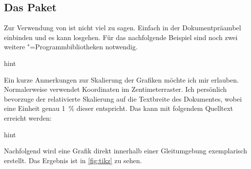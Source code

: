 \documentclass[%
  english,ngerman,%
  cdgeometry=no,DIV=12,%
  cd=false,cdfont=false,cdtitle=true,%
  headings=normal,%
  automark,%
  listof=toc,%
]{tudscrartcl}
\begin{document}
\subsection{Das Paket }

Zur Verwendung von  ist nicht viel zu sagen. Einfach in der 
Dokumentpräambel einbinden und es kann losgehen. Für das nachfolgende Beispiel 
sind noch zwei weitere "=Programmbibliotheken notwendig.
%
\begin{Code}{hint}
\usepackage{tikz}
\usetikzlibrary{chains}
\usetikzlibrary{decorations.markings}
\tikzset{on grid}
\end{Code}

Ein kurze Anmerkungen zur Skalierung der Grafiken möchte ich mir erlauben. 
Normalerweise verwendet  Koordinaten im Zentimeterraster. Ich 
persönlich bevorzuge der relativierte Skalierung auf die Textbreite des 
Dokumentes, wobei eine Einheit genau \SI{1}{\percent} dieser entspricht. Das 
kann mit folgendem Quelltext erreicht werden:
%
\CodeHook{\renewcommand\newlength[1]{}}
\begin{Code}[input]{hint}
\newlength{\tikzunit}
\setlength{\tikzunit}{.01\textwidth}
\tikzset{x=\tikzunit,y=\tikzunit}
\end{Code}

Nachfolgend wird eine Grafik direkt innerhalb einer Gleitumgebung exemplarisch 
erstellt. Das Ergebnis ist in \autoref{fig:tikz} zu sehen.
\end{document}
